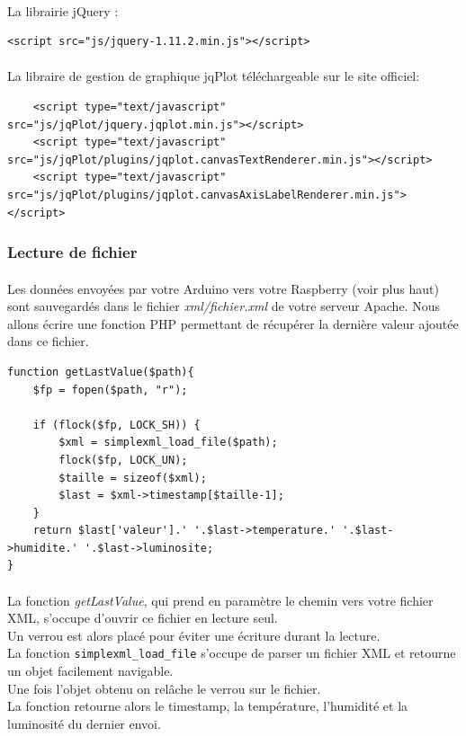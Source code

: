\documentclass[a4paper, titlepage, oneside, 12pt]{article}%
\begin{document}
\paragraph{}
La librairie jQuery :
\begin{lstlisting}
<script src="js/jquery-1.11.2.min.js"></script>	
\end{lstlisting}
\paragraph{}
La libraire de gestion de graphique jqPlot téléchargeable sur le site officiel:
\begin{lstlisting}
	<script type="text/javascript" src="js/jqPlot/jquery.jqplot.min.js"></script>	
	<script type="text/javascript" src="js/jqPlot/plugins/jqplot.canvasTextRenderer.min.js"></script>
	<script type="text/javascript" src="js/jqPlot/plugins/jqplot.canvasAxisLabelRenderer.min.js"></script>	
\end{lstlisting}

\subsubsection{Lecture de fichier}
\paragraph{}
Les données envoyées par votre Arduino vers votre Raspberry (voir plus haut) sont sauvegardés dans le fichier \textit{xml/fichier.xml} de votre serveur Apache. Nous allons écrire une fonction PHP permettant de récupérer la dernière valeur ajoutée dans ce fichier.
\begin{lstlisting}
function getLastValue($path){
	$fp = fopen($path, "r");
		
	if (flock($fp, LOCK_SH)) {
		$xml = simplexml_load_file($path);
		flock($fp, LOCK_UN);
		$taille = sizeof($xml);
		$last = $xml->timestamp[$taille-1];	
	}
	return $last['valeur'].' '.$last->temperature.' '.$last->humidite.' '.$last->luminosite;
}	
\end{lstlisting}

\paragraph{}
La fonction \textit{getLastValue}, qui prend en paramètre le chemin vers votre fichier XML, s'occupe d'ouvrir ce fichier en lecture seul.\\
Un verrou est alors placé pour éviter une écriture durant la lecture.\\
La fonction \texttt{simplexml\_load\_file} s'occupe de parser un fichier XML et retourne un objet facilement navigable.\\
Une fois l'objet obtenu on relâche le verrou sur le fichier. \\
La fonction retourne alors le timestamp, la température, l'humidité et la luminosité du dernier envoi.\\
\end{document}
